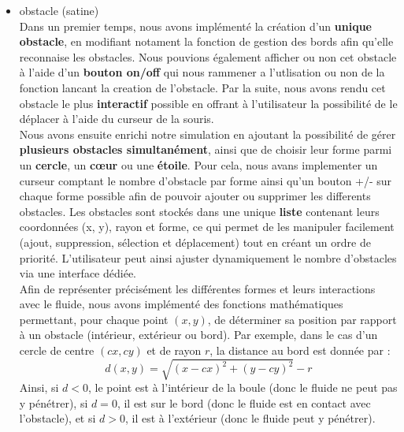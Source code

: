 \documentclass[a4paper]{article}
\begin{document}
\begin{enumerate}
\begin{itemize}
    \item obstacle (satine)\\
            {\color{WildStrawberry} 
                Dans un premier temps, nous avons implémenté la création d'un \textbf{unique obstacle}, 
                en modifiant notament la fonction de gestion des bords afin qu'elle reconnaise les obstacles. 
                Nous pouvions également afficher ou non cet obstacle à l'aide d'un \textbf{bouton on/off} qui nous rammener a 
                l'utlisation ou non de la fonction lancant la creation de l'obstacle. 
                Par la suite, nous avons rendu cet obstacle le plus \textbf{interactif} possible en offrant à l'utilisateur 
                la possibilité de le déplacer à l'aide du curseur de la souris.\\

                Nous avons ensuite enrichi notre simulation en ajoutant la possibilité de gérer 
                \textbf{plusieurs obstacles simultanément}, ainsi que de choisir leur forme parmi 
                un \textbf{cercle}, un \textbf{cœur} ou une \textbf{étoile}. Pour cela, nous avans implementer
                un curseur comptant le nombre d'obstacle par forme ainsi qu'un bouton +/- sur chaque forme possible afin de pouvoir 
                ajouter ou supprimer les differents obstacles.
                Les obstacles sont stockés dans une unique \textbf{liste} contenant leurs coordonnées (x, y), rayon et forme, 
                ce qui permet de les manipuler facilement (ajout, suppression, sélection et déplacement) tout en créant un ordre de priorité. 
                L'utilisateur peut ainsi ajuster dynamiquement le nombre d'obstacles via une interface dédiée.\\

                Afin de représenter précisément les différentes formes et leurs interactions avec le fluide, 
                nous avons implémenté des fonctions mathématiques permettant, pour chaque point $(x,y)$, 
                de déterminer sa position par rapport à un obstacle (intérieur, extérieur ou bord). 
                Par exemple, dans le cas d'un cercle de centre $(cx,cy)$ et de rayon $r$, la distance au bord est donnée par :
                \[
                d(x,y) = \sqrt{(x-cx)^2 + (y-cy)^2} - r
                \]
                Ainsi, si $d < 0$, le point est à l'intérieur de la boule (donc le fluide ne peut pas y pénétrer),
                si $d = 0$, il est sur le bord (donc le fluide est en contact avec l'obstacle), et si $d > 0$, il est à l'extérieur (donc le fluide peut y pénétrer). \\

}
\end{itemize}
\end{enumerate}
\end{document}
